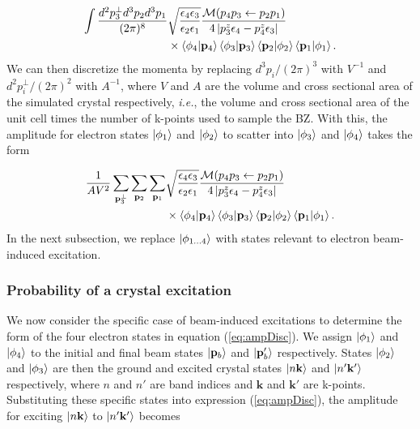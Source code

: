 \documentclass[twoside,twocolumn,9pt]{article}
\begin{document}
\begin{equation} 
  \label{eq:amp3Mom} 
  \begin{aligned} 
    \int\frac{d^2p_3^\perp
    d^3p_2d^3p_1}{(2\pi)^{8}}
    &\sqrt{\frac{\epsilon_4\epsilon_3}{\epsilon_2\epsilon_1}}
    \frac{\mathcal{M}(p_4p_3\leftarrow p_2p_1)} {4\left|p_3^z\epsilon_4 -
    p_4^z\epsilon_3\right|}
    \\&\times
    \bra{\phi_4}\ket{\mathbf{p}_4}
    \bra{\phi_3}\ket{\mathbf{p}_3}
    \bra{\mathbf{p}_2}\ket{\phi_2}
    \bra{\mathbf{p}_1}\ket{\phi_1}.  
  \end{aligned} 
\end{equation}
%
We can then discretize the momenta by replacing $d^3p_i/(2\pi)^3$ with $V^{-1}$
and $d^2p_i^\perp/(2\pi)^2$ with $A^{-1}$, where $V$ and $A$ are the volume and
cross sectional area of the simulated crystal respectively, \textit{i.e.}, the
volume and cross sectional area of the unit cell times the number of k-points
used to sample the BZ.
With this, the amplitude for electron states $\ket{\phi_1}$ and $\ket{\phi_2}$
to scatter into $\ket{\phi_3}$ and $\ket{\phi_4}$ takes the form

\begin{equation} 
  \label{eq:ampDisc} 
  \begin{aligned} 
    \frac{1}{AV^2}
    \sum_{\mathbf{p}_3^\perp} \sum_{\mathbf{p}_2} \sum_{\mathbf{p}_1}
    &\sqrt{\frac{\epsilon_4\epsilon_3}{\epsilon_2\epsilon_1}}
    \frac{\mathcal{M}(p_4p_3\leftarrow p_2p_1)} {4\left|p_3^z\epsilon_4 -
    p_4^z\epsilon_3\right|}
    \\&\times
    \bra{\phi_4}\ket{\mathbf{p}_4}
    \bra{\phi_3}\ket{\mathbf{p}_3}
    \bra{\mathbf{p}_2}\ket{\phi_2}
    \bra{\mathbf{p}_1}\ket{\phi_1}.  
  \end{aligned} 
\end{equation}
%
In the next subsection, we replace $\ket{\phi_{1\dots 4}}$ with states relevant to
electron beam-induced excitation.

\subsubsection{Probability of a crystal excitation} 
\label{sec:crystal}

We now consider the specific case of beam-induced excitations to determine the
form of the four electron states in equation (\ref{eq:ampDisc}).  We assign
$\ket{\phi_1}$ and $\ket{\phi_4}$ to the initial and final beam states
$\ket{\mathbf{p}_b}$ and $\ket{\mathbf{p}_b'}$ respectively.  States $\ket{\phi_2}$ and
$\ket{\phi_3}$ are then the ground and excited crystal states
$\ket{n\mathbf{k}}$ and $\ket{n'\mathbf{k'}}$ respectively, where $n$ and $n'$
are band indices and $\mathbf{k}$ and $\mathbf{k'}$ are k-points.
Substituting these specific states into expression (\ref{eq:ampDisc}), the
amplitude for exciting $\ket{n\mathbf{k}}$ to $\ket{n'\mathbf{k'}}$ becomes
\end{document}
